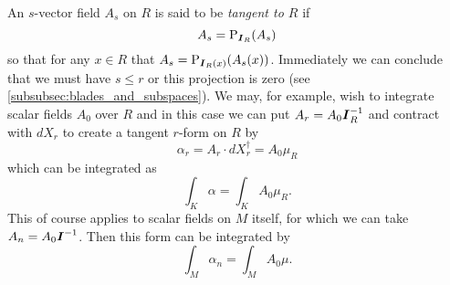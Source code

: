 An $s$-vector field $A_s$ on $R$ is said to be \emph{tangent to $R$} if
\begin{equation}
A_s = \operatorname{P}_{\boldsymbol{I}_R}(A_s)
\end{equation} 
so that for any $x \in R$ that $A_s = \operatorname{P}_{\boldsymbol{I}_R(x)}(A_s(x))$. Immediately we can conclude that we must have $s\leq r$ or this projection is zero (see \cref{subsubsec:blades_and_subspaces}). We may, for example, wish to integrate scalar fields $A_0$ over $R$ and in this case we can put $A_r = A_0 \boldsymbol{I}_R^{-1}$ and contract with $dX_r$ to create a tangent $r$-form on $R$ by 
\begin{equation}
\alpha_r = A_r \cdot dX_r^\dagger = A_0 \mu_R
\end{equation}
which can be integrated as
\begin{equation}
\int_K \alpha = \int_K A_0 \mu_R.
\end{equation}
This of course applies to scalar fields on $M$ itself, for which we can take $A_n = A_0 \boldsymbol{I}^{-1}$. Then this form can be integrated by
\begin{equation}
\int_M \alpha_n = \int_M A_0 \mu.
\end{equation}

